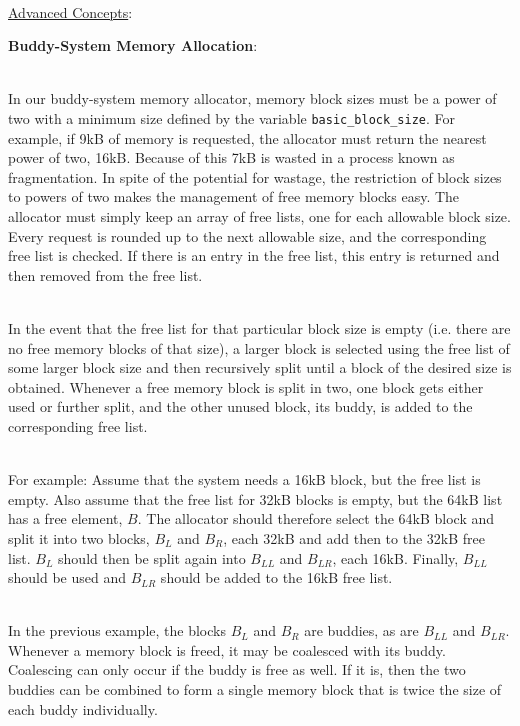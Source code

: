 \documentclass[12pt]{extarticle}
\newenvironment{myindentpar}[1]%
 {\begin{list}{}%
         {\setlength{\leftmargin}{#1}}%
         \item[]%
 }
 {\end{list}}
\newcommand{\code}[1]{\colorbox{codegray}{\texttt{#1}}}
\begin{document}
\ \\
{\large \underline{Advanced Concepts}:}

\begin{myindentpar}{6.5mm}

    \noindent
    \textbf{Buddy-System Memory Allocation}:
    
    \ \\
    In our buddy-system memory allocator, memory block sizes must be a power of two with a minimum size defined by the variable \code{basic\_block\_size}.  For example, if 9kB of memory is requested, the allocator must return the nearest power of two, 16kB.  Because of this 7kB is wasted in a process known as fragmentation.  In spite of the potential for wastage, the restriction of block sizes to powers of two makes the management of free memory blocks easy.  The allocator must simply keep an array of free lists, one for each allowable block size.  Every request is rounded up to the next allowable size, and the corresponding free list is checked.  If there is an entry in the free list, this entry is returned and then removed from the free list.  
    
    \ \\
    In the event that the free list for that particular block size is empty (i.e. there are no free memory blocks of that size), a larger block is selected using the free list of some larger block size and then recursively split until a block of the desired size is obtained.  Whenever a free memory block is split in two, one block gets either used or further split, and the other unused block, its buddy, is added to the corresponding free list.  
    
    \ \\
    For example: Assume that the system needs a 16kB block, but the free list is empty.  Also assume that the free list for 32kB blocks is empty, but the 64kB list has a free element, $B$.  The allocator should therefore select the 64kB block and split it into two blocks, $B_{L}$ and $B_{R}$, each 32kB and add then to the 32kB free list.  $B_{L}$ should then be split again into $B_{LL}$ and $B_{LR}$, each 16kB.  Finally, $B_{LL}$ should be used and $B_{LR}$ should be added to the 16kB free list.  
    
    \ \\
    In the previous example, the blocks $B_{L}$ and $B_{R}$ are buddies, as are $B_{LL}$ and $B_{LR}$.  Whenever a memory block is freed, it may be coalesced with its buddy.  Coalescing can only occur if the buddy is free as well.  If it is, then the two buddies can be combined to form a single memory block that is twice the size of each buddy individually.  
    

\end{myindentpar}
\end{document}
